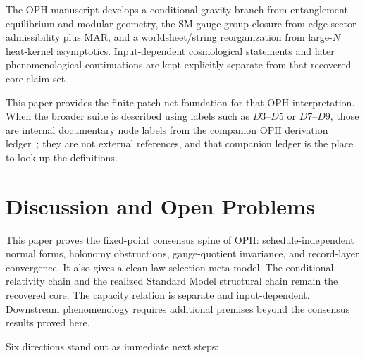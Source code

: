 \documentclass[11pt]{article}
\theoremstyle{remark}
\theoremstyle{plain}
\begin{document}
The OPH manuscript develops a conditional gravity branch from entanglement equilibrium and modular geometry, the SM gauge-group closure from edge-sector admissibility plus MAR, and a worldsheet/string reorganization from large-$N$ heat-kernel asymptotics. Input-dependent cosmological statements and later phenomenological continuations are kept explicitly separate from that recovered-core claim set.

This paper provides the finite patch-net foundation for that OPH interpretation. When the broader
suite is described using labels such as \(D3\)--\(D5\) or \(D7\)--\(D9\), those are internal
documentary node labels from the companion OPH derivation ledger~\cite{OPH}; they are not
external references, and that companion ledger is the place to look up the definitions.


\section{Discussion and Open Problems}

This paper proves the fixed-point consensus spine of OPH: schedule-independent normal forms,
holonomy obstructions, gauge-quotient invariance, and record-layer convergence. It also gives a
clean law-selection meta-model. The conditional relativity chain and the realized Standard Model
structural chain remain the recovered core. The capacity relation is separate and input-dependent.
Downstream phenomenology requires additional premises beyond the consensus results proved here.

Six directions stand out as immediate next steps:
\end{document}
